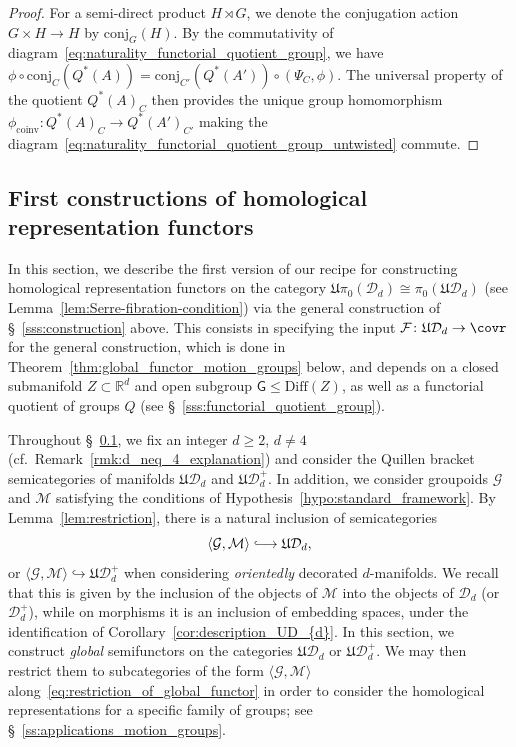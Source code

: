 \documentclass[AHL,Unicode,published]{cedram}
\newcommand{\Diff}{\mathrm{Diff}}
\newcommand{\rcoinv}{\mathrm{coinv}}
\newcommand{\rconj}{\mathrm{conj}}
\newcommand{\fU}{\ensuremath{\mathfrak{U}}}
\newcommand{\sG}{\mathsf{G}}
\newcommand{\cD}{\mathcal{D}}
\newcommand{\cF}{\mathcal{F}}
\newcommand{\cG}{\mathcal{G}}
\newcommand{\cM}{\mathcal{M}}
\newcommand{\bR}{\mathbb{R}}
\newcommand{\longhookrightarrow}{\lhook\joinrel\longrightarrow}
\renewcommand{\geq}{\geqslant}
\renewcommand{\leq}{\leqslant}
\begin{document}
\begin{proof}
For a semi-direct product $H \rtimes G$, we denote the conjugation action $G\times H\to H$ by $\rconj_{G}(H)$. By the commutativity of diagram~\eqref{eq:naturality_functorial_quotient_group}, we have $\phi\circ\rconj_{C}(Q^{*}(A)) = \rconj_{C'}(Q^{*}(A'))\circ (\Psi_{C},\phi)$. The universal property of the quotient $Q^{*}(A)_{C}$ then provides the unique group homomorphism $\phi_{\rcoinv} \colon Q^{*}(A)_{C}\to Q^{*}(A')_{C'}$ making the diagram~\eqref{eq:naturality_functorial_quotient_group_untwisted} commute.
\end{proof}


\subsection{First constructions of homological representation functors}\label{ss:homological_representation_functor_motion_groups}

In this section, we describe the first version of our recipe for constructing homological representation functors on the category $\fU\pi_{0}(\cD_{d}) \cong \pi_{0}(\fU\cD_{d})$ (see Lemma~\ref{lem:Serre-fibration-condition}) via the general construction of \S~\ref{sss:construction} above. This consists in specifying the input $\cF \colon \fU\cD_{d} \to \covr$ for the general construction, which is done in Theorem~\ref{thm:global_functor_motion_groups} below, and depends on a closed submanifold $Z \subset \bR^d$ and open subgroup $\sG \leq \Diff(Z)$, as well as a functorial quotient of groups $Q$ (see \S~\ref{sss:functorial_quotient_group}).

Throughout \S~\ref{ss:homological_representation_functor_motion_groups}, we fix an integer $d \geq 2$, $d \neq 4$ (cf.~Remark~\ref{rmk:d_neq_4_explanation}) and consider the Quillen bracket semicategories of manifolds $\fU\cD_{d}$ and $\fU\cD_{d}^{+}$. In addition, we consider groupoids $\cG$ and $\cM$ satisfying the conditions of Hypothesis~\ref{hypo:standard_framework}. By Lemma~\ref{lem:restriction}, there is a natural inclusion of semicategories
\begin{equation}\label{eq:restriction_of_global_functor}
\langle \cG, \cM \rangle \longhookrightarrow \fU\cD_{d},
\end{equation}
or $\langle \cG, \cM \rangle \hookrightarrow \fU\cD_{d}^{+}$ when considering \emph{orientedly} decorated $d$-manifolds. We recall that this is given by the inclusion of the objects of $\cM$ into the objects of $\cD_{d}$ (or $\cD_{d}^{+}$), while on morphisms it is an inclusion of embedding spaces, under the identification of Corollary~\ref{cor:description_UD_{d}}. In this section, we construct \emph{global} semifunctors on the categories $\fU\cD_{d}$ or $\fU\cD_{d}^{+}$. We may then restrict them to subcategories of the form $\langle \cG, \cM \rangle$ along~\eqref{eq:restriction_of_global_functor} in order to consider the homological representations for a specific family of groups; see \S~\ref{ss:applications_motion_groups}.
\end{document}
